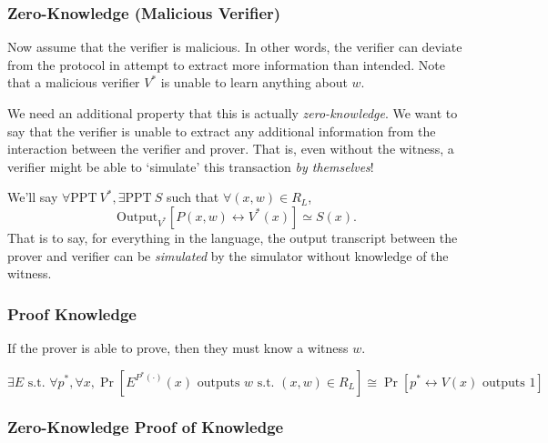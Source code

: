 \subsubsection{Zero-Knowledge (Malicious Verifier)}

Now assume that the verifier is malicious. In other words, the verifier can deviate from the protocol in attempt to extract more information than intended. Note that a malicious verifier $V^*$ is unable to learn anything about $w$.

We need an additional property that this is actually \emph{zero-knowledge}. We want to say that the verifier is unable to extract any additional information from the interaction between the verifier and prover. That is, even without the witness, a verifier might be able to `simulate' this transaction \emph{by themselves}!

    We'll say $\forall \mathrm{PPT}\ V^*, \exists \mathrm{PPT}\ S$ such that $\forall (x, w)\in R_L$,
    \[\mathrm{Output}_{V^*}[P(x, w)\leftrightarrow V^*(x)]\simeq S(x).\]
    That is to say, for everything in the language, the output transcript between the prover and verifier can be \emph{simulated} by the simulator without knowledge of the witness.

\subsubsection{Proof Knowledge}

If the prover is able to prove, then they must know a witness $w$.

\[ \exists E \text{ s.t. } \forall p^*, \forall x, \Pr[E^{P^*(\cdot)}(x) \text{ outputs }w \text{ s.t. }(x, w) \in R_L] \cong \Pr[p^* \leftrightarrow V(x) \text{ outputs } 1]\]

\subsubsection{Zero-Knowledge Proof of Knowledge}

